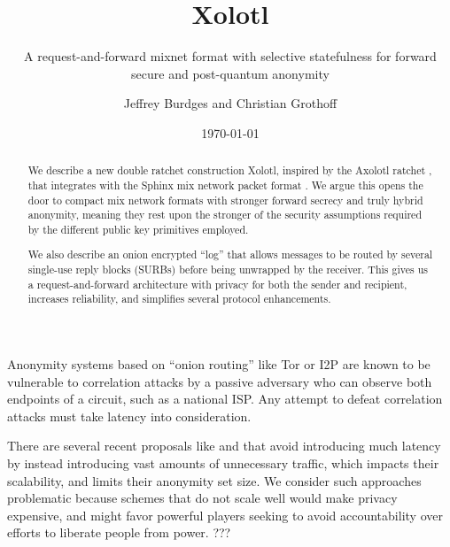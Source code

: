 \documentclass[twoside,letterpaper]{llncs}
\title{Xolotl}
\subtitle{A request-and-forward mixnet format with selective statefulness for forward secure and post-quantum anonymity}
\author{Jeffrey Burdges and Christian Grothoff}
\date{\today}
\begin{document}
\maketitle



\begin{abstract}
We describe a new double ratchet construction Xolotl,
 inspired by the Axolotl ratchet \cite{TextSecure}, that
integrates with the Sphinx mix network packet format \cite{Sphinx}.
We argue this opens the door to compact mix network formats with
stronger forward secrecy and truly hybrid anonymity, meaning they
rest upon the stronger of the security assumptions required by
 the different public key primitives employed.

We also describe an onion encrypted ``log'' that allows messages to
be routed by several single-use reply blocks (SURBs) before being
unwrapped by the receiver.  This gives us a request-and-forward
architecture with privacy for both the sender and recipient,
increases reliability, and simplifies several protocol enhancements.
\end{abstract}



Anonymity systems based on ``onion routing'' \cite{SS03,timing-fc2004}
like Tor or I2P are known to be vulnerable to correlation attacks by
a passive adversary who can observe both endpoints of a circuit, such
as a national ISP.   Any attempt to defeat correlation attacks must
take latency into consideration. 

There are several recent proposals like \cite{Alpenhorn} and
\cite{Dissent} that avoid introducing much latency by instead
introducing vast amounts of unnecessary traffic, which impacts their
scalability, and limits their anonymity set size.  We consider such
approaches problematic because schemes that do not scale well would
make privacy expensive, and might favor powerful players seeking to
avoid accountability over efforts to liberate people from power. ???
\end{document}
